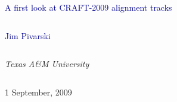 \documentclass[compress]{beamer}
\begin{document}
\begin{frame}
\vfill
\begin{center}
\textcolor{darkblue}{\Large A first look at CRAFT-2009 alignment tracks}

\vfill
\begin{columns}
\begin{center}
\large
\textcolor{darkblue}{Jim Pivarski}
\end{center}
\end{columns}

\begin{columns}
\begin{center}
\scriptsize
{\it Texas A\&M University}
\end{center}
\end{columns}

\vfill
 1 September, 2009

\end{center}
\end{frame}


\small
\end{document}
